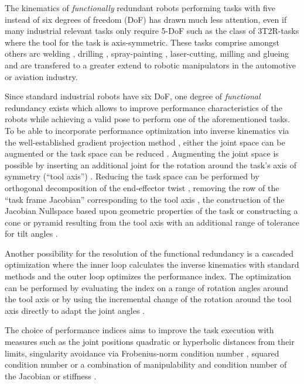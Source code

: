 \documentclass{svproc}
\begin{document}
The kinematics of \emph{functionally} redundant robots performing tasks with five instead of six degrees of freedom (DoF) has drawn much less attention, even if many industrial relevant tasks only require 5-DoF such as the class of 3T2R-tasks where the tool for the task is axis-symmetric.
These tasks comprise amongst others arc welding \cite{HuoBar2005}, drilling \cite{ZhuQuCaoYan2013,GuoDonKe2015}, spray-painting \cite{FromGra2010}, laser-cutting, milling and glueing and are transfered to a greater extend to robotic manipulators in the automotive or aviation industry.

Since standard industrial robots have six DoF, one degree of \emph{functional} redundancy exists which allows to improve performance characteristics of the robots while achieving a valid pose to perform one of the aforementioned tasks.
To be able to incorporate performance optimization into inverse kinematics via the well-established gradient projection method \cite{Yoshikawa1984}, either the joint space can be augmented or the task space can be reduced \cite{Huo2009}.
Augmenting the joint space is possible by inserting an additional joint for the rotation around the task's axis of symmetry (``tool axis'') \cite{Baron2000}.
Reducing the task space can be performed by orthogonal decomposition of the end-effector twist \cite{HuoBar2005}, removing the row of the ``task frame Jacobian'' corresponding to the tool axis \cite{Zlajpah2017}, the construction of the Jacobian Nullspace based upon geometric properties of the task \cite{LegerAng2016} or constructing a cone or pyramid resulting from the tool axis with an additional range of tolerance for tilt angles \cite{FromGra2010}.

Another possibility for the resolution of the functional redundancy is a cascaded optimization where the inner loop calculates the inverse kinematics with standard methods and the outer loop optimizes the performance index.
The optimization can be performed by evaluating the index on a range of rotation angles around the tool axis \cite{ZhuQuCaoYan2013} or by using the incremental change of the rotation around the tool axis directly to adapt the joint angles  \cite{GuoDonKe2015}.

The choice of performance indices aims to improve the task execution with measures such as the joint positions quadratic \cite{HuoBar2005} or hyperbolic \cite{ZhuQuCaoYan2013} distances from their limits, singularity avoidance via Frobenius-norm condition number \cite{ZhuQuCaoYan2013}, squared condition number \cite{LegerAng2016} or a combination of manipulability and condition number of the Jacobian \cite{HuoBar2008} or stiffness \cite{GuoDonKe2015}.
\end{document}
